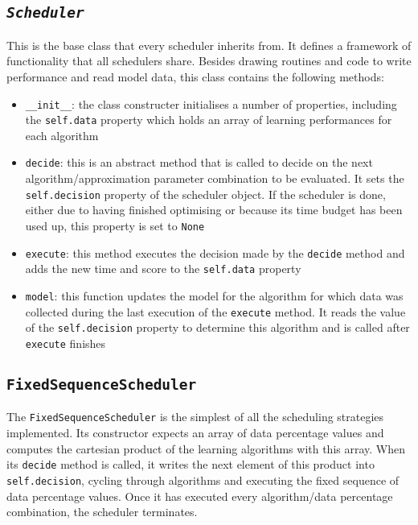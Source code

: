 \documentclass[a4paper,12pt,twoside,openright]{report}
\begin{document}
\subsection{\texttt{\textit{Scheduler}}}
This is the base class that every scheduler inherits from. It defines a framework of functionality that all schedulers share. Besides drawing routines and code to write performance and read model data, this class contains the following methods:

\begin{itemize}
\item \texttt{\_\_init\_\_}: the class constructer initialises a number of properties, including the \texttt{self.data} property which holds an array of learning performances for each algorithm
\item \texttt{decide}: this is an abstract method that is called to decide on the next algorithm/approximation parameter combination to be evaluated. It sets the \texttt{self.decision} property of the scheduler object. If the scheduler is done, either due to having finished optimising or because its time budget has been used up, this property is set to \texttt{None}
\item \texttt{execute}: this method executes the decision made by the \texttt{decide} method and adds the new time and score to the \texttt{self.data} property
\item \texttt{model}: this function updates the model for the algorithm for which data was collected during the last execution of the \texttt{execute} method. It reads the value of the \texttt{self.decision} property to determine this algorithm and is called after \texttt{execute} finishes
\end{itemize}



\subsection{\texttt{FixedSequenceScheduler}}
The \texttt{FixedSequenceScheduler} is the simplest of all the scheduling strategies implemented. Its constructor expects an array of data percentage values and computes the cartesian product of the learning algorithms with this array. When its \texttt{decide} method is called, it writes the next element of this product into \texttt{self.decision}, cycling through algorithms and executing the fixed sequence of data percentage values. Once it has executed every algorithm/data percentage combination, the scheduler terminates.
\end{document}
